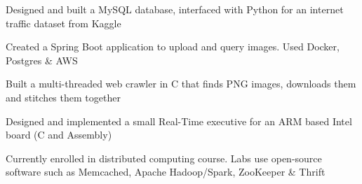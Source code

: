 \documentclass[]{hieudo-build}
\begin{document}
\begin{minipage}[t]{1.0\textwidth}
\descript{}
Designed and built a MySQL database, interfaced with Python for an internet traffic dataset from Kaggle
\sectionsep

\descript{}
Created a Spring Boot application to upload and query images. Used Docker, Postgres \& AWS
\sectionsep

\descript{}
Built a multi-threaded web crawler in C that finds PNG images, downloads them and stitches them together
\sectionsep

\descript{}
Designed and implemented a small Real-Time executive for an ARM based Intel board (C and Assembly)
\sectionsep

\descript{}
Currently enrolled in distributed computing course. Labs use open-source software such as Memcached, Apache Hadoop/Spark, ZooKeeper \& Thrift 
\sectionsep






\end{minipage} 
\end{document}

